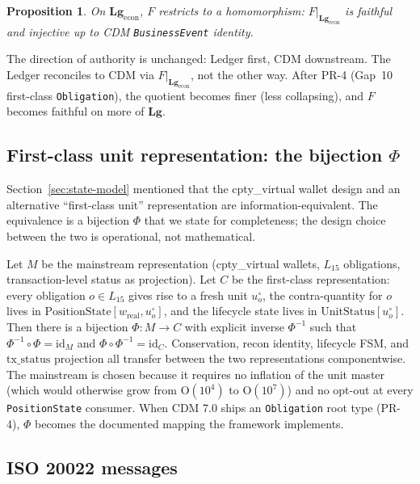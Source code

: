 \documentclass[11pt,a4paper]{article}
\newtheorem{proposition}[definition]{Proposition}
\begin{document}
\begin{proposition}
On $\mathbf{Lg}_{\mathrm{econ}}$, $F$ restricts to a homomorphism: $F|_{\mathbf{Lg}_{\mathrm{econ}}}$ is faithful and injective up to CDM \texttt{BusinessEvent} identity.
\end{proposition}

The direction of authority is unchanged: Ledger first, CDM downstream. The Ledger reconciles to CDM via $F|_{\mathbf{Lg}_{\mathrm{econ}}}$, not the other way. After PR-4 (Gap~10 first-class \texttt{Obligation}), the quotient becomes finer (less collapsing), and $F$ becomes faithful on more of $\mathbf{Lg}$.

\subsection{First-class unit representation: the bijection $\Phi$}
\label{sec:bijection}

Section~\ref{sec:state-model} mentioned that the cpty\_virtual wallet design and an alternative ``first-class unit'' representation are information-equivalent. The equivalence is a bijection $\Phi$ that we state for completeness; the design choice between the two is operational, not mathematical.

Let $M$ be the mainstream representation (cpty\_virtual wallets, $L_{15}$ obligations, transaction-level status as projection). Let $C$ be the first-class representation: every obligation $o \in L_{15}$ gives rise to a fresh unit $u^\circ_o$, the contra-quantity for $o$ lives in $\mathrm{PositionState}[w_{\mathrm{real}}, u^\circ_o]$, and the lifecycle state lives in $\mathrm{UnitStatus}[u^\circ_o]$. Then there is a bijection $\Phi : M \to C$ with explicit inverse $\Phi^{-1}$ such that $\Phi^{-1} \circ \Phi = \mathrm{id}_M$ and $\Phi \circ \Phi^{-1} = \mathrm{id}_C$. Conservation, recon identity, lifecycle FSM, and $\mathrm{tx\_status}$ projection all transfer between the two representations componentwise. The mainstream is chosen because it requires no inflation of the unit master (which would otherwise grow from $\mathrm{O}(10^4)$ to $\mathrm{O}(10^7)$) and no opt-out at every \texttt{PositionState} consumer. When CDM 7.0 ships an \texttt{Obligation} root type (PR-4), $\Phi$ becomes the documented mapping the framework implements.

\subsection{ISO 20022 messages}
\label{sec:cdm-iso20022}
\end{document}
